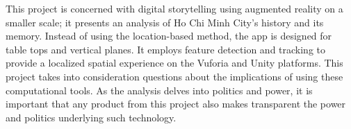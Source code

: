 \begin{figure}[!ht]
\end{figure}

This project is concerned with digital storytelling using augmented reality on a smaller scale; it presents an analysis of Ho Chi Minh City's history and its memory. Instead of using the location-based method, the app is designed for table tops and vertical planes. It employs feature detection and tracking to provide a localized spatial experience on the Vuforia and Unity platforms. This project takes into consideration questions about the implications of using these computational tools. As the analysis delves into politics and power, it is important that any product from this project also makes transparent the power and politics underlying such technology.
